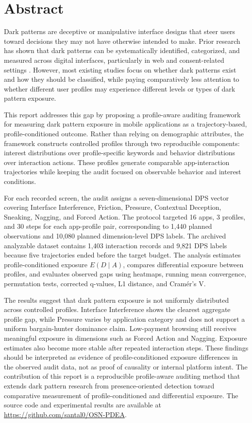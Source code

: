 \chapter*{Abstract}

Dark patterns are deceptive or manipulative interface designs that steer users toward decisions they may not have otherwise intended to make. Prior research has shown that dark patterns can be systematically identified, categorized, and measured across digital interfaces, particularly in web and consent-related settings \cite{gray2018darkpatterns,mathur2019darkpatterns,nouwens2020gdpr}. However, most existing studies focus on whether dark patterns exist and how they should be classified, while paying comparatively less attention to whether different user profiles may experience different levels or types of dark pattern exposure.

This report addresses this gap by proposing a profile-aware auditing framework for measuring dark pattern exposure in mobile applications as a trajectory-based, profile-conditioned outcome. Rather than relying on demographic attributes, the framework constructs controlled profiles through two reproducible components: interest distributions over profile-specific keywords and behavior distributions over interaction actions. These profiles generate comparable app-interaction trajectories while keeping the audit focused on observable behavior and interest conditions.

For each recorded screen, the audit assigns a seven-dimensional DPS vector covering Interface Interference, Friction, Pressure, Contextual Deception, Sneaking, Nagging, and Forced Action. The protocol targeted 16 apps, 3 profiles, and 30 steps for each app-profile pair, corresponding to 1,440 planned observations and 10,080 planned dimension-level DPS labels. The archived analyzable dataset contains 1,403 interaction records and 9,821 DPS labels because five trajectories ended before the target budget. The analysis estimates profile-conditioned exposure \(E(D \mid A)\), compares differential exposure between profiles, and evaluates observed gaps using heatmaps, running mean convergence, permutation tests, corrected q-values, L1 distance, and Cramér's V.

The results suggest that dark pattern exposure is not uniformly distributed across controlled profiles. Interface Interference shows the clearest aggregate profile gap, while Pressure varies by application category and does not support a uniform bargain-hunter dominance claim. Low-payment browsing still receives meaningful exposure in dimensions such as Forced Action and Nagging. Exposure estimates also become more stable after repeated interaction steps. These findings should be interpreted as evidence of profile-conditioned exposure differences in the observed audit data, not as proof of causality or internal platform intent. The contribution of this report is a reproducible profile-aware auditing method that extends dark pattern research from presence-oriented detection toward comparative measurement of profile-conditioned and differential exposure. The source code and experimental results are available at \url{https://github.com/santal0/OSN-PDEA}.
